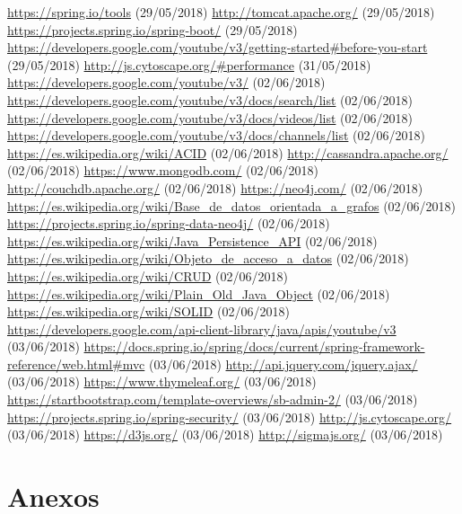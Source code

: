 \documentclass[11pt,a4paper]{article}
\begin{document}
\begin{thebibliography}{0}
   \url{https://spring.io/tools} (29/05/2018) 
   \url{http://tomcat.apache.org/} (29/05/2018) 
   \url{https://projects.spring.io/spring-boot/} (29/05/2018) 
   \url{https://developers.google.com/youtube/v3/getting-started#before-you-start} (29/05/2018) 
   \url{http://js.cytoscape.org/#performance} (31/05/2018) 
   \url{https://developers.google.com/youtube/v3/} (02/06/2018) 
   \url{https://developers.google.com/youtube/v3/docs/search/list} (02/06/2018)  
   \url{https://developers.google.com/youtube/v3/docs/videos/list} (02/06/2018)  
   \url{https://developers.google.com/youtube/v3/docs/channels/list} (02/06/2018)
   \url{https://es.wikipedia.org/wiki/ACID} (02/06/2018)  
   \url{http://cassandra.apache.org/} (02/06/2018)
   \url{https://www.mongodb.com/} (02/06/2018)
   \url{http://couchdb.apache.org/} (02/06/2018)
   \url{https://neo4j.com/} (02/06/2018)
   \url{https://es.wikipedia.org/wiki/Base_de_datos_orientada_a_grafos} (02/06/2018)
   \url{https://projects.spring.io/spring-data-neo4j/} (02/06/2018) 
   \url{https://es.wikipedia.org/wiki/Java_Persistence_API} (02/06/2018) 
   \url{https://es.wikipedia.org/wiki/Objeto_de_acceso_a_datos} (02/06/2018) 
   \url{https://es.wikipedia.org/wiki/CRUD} (02/06/2018)
   \url{https://es.wikipedia.org/wiki/Plain_Old_Java_Object} (02/06/2018) 
   \url{https://es.wikipedia.org/wiki/SOLID} (02/06/2018) 
   \url{https://developers.google.com/api-client-library/java/apis/youtube/v3} (03/06/2018)
   \url{https://docs.spring.io/spring/docs/current/spring-framework-reference/web.html#mvc} (03/06/2018)
   \url{http://api.jquery.com/jquery.ajax/} (03/06/2018)
   \url{https://www.thymeleaf.org/} (03/06/2018)
   \url{https://startbootstrap.com/template-overviews/sb-admin-2/} (03/06/2018)
   \url{https://projects.spring.io/spring-security/} (03/06/2018)
   \url{http://js.cytoscape.org/} (03/06/2018)
   \url{https://d3js.org/} (03/06/2018)
   \url{http://sigmajs.org/} (03/06/2018)
\end{thebibliography}
\newpage 


\section{Anexos}
\bigskip
\end{document}
